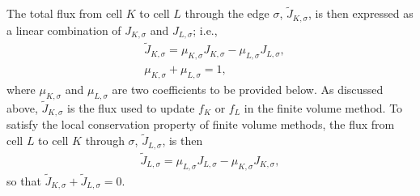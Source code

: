 \documentclass[11pt]{article}
\begin{document}
The total flux from cell $K$ to cell $L$ through the edge $\sigma$, $\tilde{J}_{K,\sigma}$, is then expressed as a linear combination of $J_{K,\sigma}$ and $J_{L,\sigma}$; i.e., 
  \begin{align}
    \label{J_KL}
          &\tilde{J}_{K,\sigma} = \mu_{K,\sigma}J_{K,\sigma} - \mu_{L,\sigma}J_{L,\sigma}, \\
          &\mu_{K,\sigma} + \mu_{L,\sigma} = 1,
  \end{align}
where $\mu_{K,\sigma}$ and $\mu_{L,\sigma}$ are two coefficients to be provided below. As discussed above, $\tilde{J}_{K,\sigma}$ is the flux used to update $f_{K}$ or $f_{L}$ in the finite volume method. To satisfy the local conservation property of finite volume methods, the flux from cell $L$ to cell $K$ through $\sigma$, $\tilde{J}_{L,\sigma}$, is then
  \begin{align}
    \tilde{J}_{L,\sigma} = \mu_{L,\sigma}J_{L,\sigma} - \mu_{K,\sigma}J_{K,\sigma},
  \end{align}
so that $\tilde{J}_{K,\sigma} + \tilde{J}_{L,\sigma} = 0$.
\end{document}

